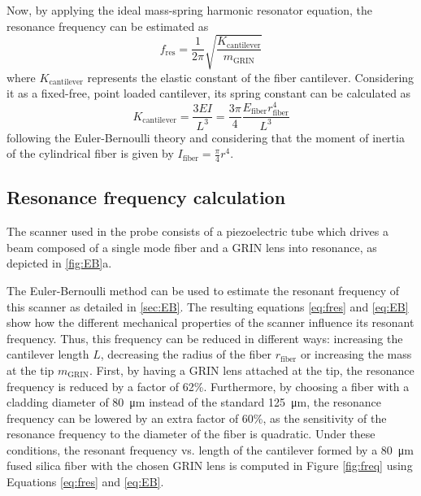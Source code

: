 \documentclass[10pt]{iopart}
\begin{document}
Now, by applying the ideal mass-spring harmonic resonator equation, the resonance frequency can be estimated as 
\begin{equation}
f_\mathrm{res} = \frac{1}{2 \pi} \sqrt{\frac{K_\mathrm{cantilever}}{m_{\mathrm{GRIN}}}} 
\label{eq:fres}
\end{equation}
where $K_\mathrm{cantilever}$ represents the elastic constant of the fiber cantilever. Considering it as a fixed-free, point loaded cantilever, its spring constant can be calculated as 
\begin{equation}
K_\mathrm{cantilever} = \frac{3 E I}{L^3} = \frac{3 \pi}{4} \frac{E_\mathrm{fiber} r_\mathrm{fiber}^4}{L^3}
\label{eq:EB}
\end{equation}
following the Euler-Bernoulli theory \cite{MarcJ.Madou2011} and considering that the moment of inertia of the cylindrical fiber is given by $I_\mathrm{fiber} = \frac{\pi}{4} r^4$. 

\subsection{Resonance frequency calculation}
The scanner used in the probe consists of a piezoelectric tube which drives a beam composed of a single mode fiber and a GRIN lens into resonance, as depicted in \autoref{fig:EB}a.  



The Euler-Bernoulli method can be used to estimate the resonant frequency of this scanner as detailed in \autoref{sec:EB}. The resulting equations \ref{eq:fres} and \ref{eq:EB} show how the different mechanical properties of the scanner influence its resonant frequency. Thus, this frequency can be reduced in different ways: increasing the cantilever length $L$, decreasing the radius of the fiber $r_\mathrm{fiber}$ or increasing the mass at the tip $m_{\mathrm{GRIN}}$. First, by having a GRIN lens attached at the tip, the resonance frequency is reduced by a factor of 62\%. Furthermore, by choosing a fiber with a cladding diameter of \SI{80}{\micro\meter} instead of the standard \SI{125}{\micro\meter}, the resonance frequency can be lowered by an extra factor of 60\%, as the sensitivity of the resonance frequency to the diameter of the fiber is quadratic. Under these conditions, the resonant frequency vs. length of the cantilever formed by a \SI{80}{\micro\meter} fused silica fiber with the chosen GRIN lens is computed in Figure \ref{fig:freq} using Equations \ref{eq:fres} and \ref{eq:EB}.
\end{document}
